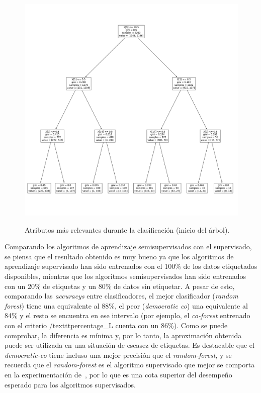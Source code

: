 \begin{figure}[h]
	\caption[\textit{Phishing}: detección (\texttt{f1-f19}, atributos relevantes DT)]{Atributos más relevantes durante la clasificación (inicio del árbol).}
	\centering
	\includegraphics[width=\textwidth]{../img/memoria/5_phishing/f1f19_tree}
	\label{gr:ph-f1f19_tree}
\end{figure}

Comparando los algoritmos de aprendizaje semisupervisados con el supervisado, se piensa que el resultado obtenido es muy bueno ya que los algoritmos de aprendizaje supervisado han sido entrenados con el 100\% de los datos etiquetados disponibles, mientras que los algoritmos semisupervisados han sido entrenados con un 20\% de etiquetas y un 80\% de datos sin etiquetar. A pesar de esto, comparando las \textit{accuracys} entre clasificadores, el mejor clasificador (\textit{random forest}) tiene una equivalente al 88\%, el peor (\textit{democratic co}) una equivalente al 84\% y el resto se encuentra en ese intervalo (por ejemplo, el \textit{co-forest} entrenado con el criterio /texttt{percentage\_L} cuenta con un 86\%). Como se puede comprobar, la diferencia es mínima y, por lo tanto, la aproximación obtenida puede ser utilizada en una situación de escasez de etiquetas. Es destacable que el \textit{democratic-co} tiene incluso una mejor precisión que el \textit{random-forest}, y se recuerda que el \textit{random-forest} es el algoritmo supervisado que mejor se comporta en la experimentación de~\cite{featuresPhishing2018Gupta}, por lo que es una cota superior del desempeño esperado para los algoritmos supervisados.

